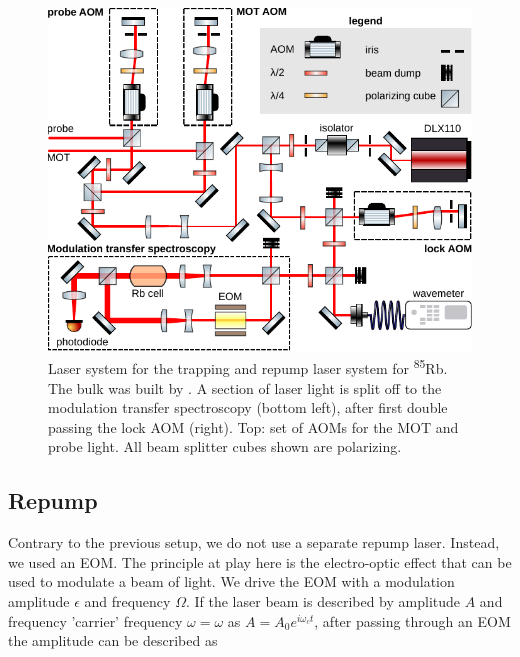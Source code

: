 \begin{figure}
    \centering
    \includegraphics[width=\linewidth]{figures/RbLaserSetup.pdf}
    \caption{Laser system for the trapping and repump laser system for \textsuperscript{85}Rb.
    The bulk was built by \cite{Reijnders2010}.
    A section of laser light is split off to the modulation transfer spectroscopy (bottom left), after first double passing the lock \ac{AOM} (right). 
    Top: set of AOMs for the MOT and probe light.
    All beam splitter cubes shown are polarizing.
    }
    \label{fig:RbLaserSetup}
\end{figure}

\subsection{Repump}

Contrary to the previous setup, we do not use a separate repump laser. 
Instead, we used an \ac{EOM}.
The principle at play here is the electro-optic effect that can be used to modulate a beam of light. 
We drive the EOM with a modulation amplitude $\epsilon$ and frequency $\Omega$.
If the laser beam is described by amplitude $A$ and frequency 'carrier' frequency $\omega = \omega$ as $A = A_0 e^{i \omega_c t}$, after passing through an EOM the amplitude can be described as

